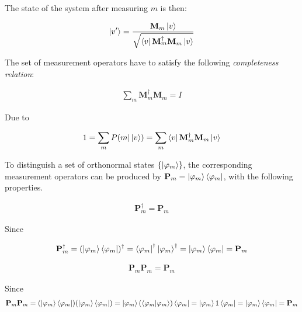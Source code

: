 The state of the system after measuring $m$ is then:

\begin{align*}
    \ket{v'} = \frac{\mathbf{M}_m\ket{v}}{\sqrt{\bra{v} \mathbf{M}_m^{\dagger} \mathbf{M}_m \ket{v}}}
\end{align*}

The set of measurement operators have to satisfy the following \textit{completeness relation}:

\begin{align*}
    \sum\limits_{m}  \mathbf{M}_m^{\dagger} \mathbf{M}_m = I
\end{align*}

Due to

\begin{align*}
    1 = \sum\limits_{m} P(m | \ket{v}) = \sum\limits_{m} \bra{v} \mathbf{M}_m^{\dagger} \mathbf{M}_m \ket{v}
\end{align*}


To distinguish a set of orthonormal states $\{\ket{\varphi_m}\}$, the corresponding measurement operators can be produced by $\mathbf{P}_m = \ket{\varphi_m}\bra{\varphi_m}$, with the following properties.

\begin{property}

\begin{align*}
\mathbf{P}_m^{\dagger} = \mathbf{P}_m
\end{align*}

Since

\begin{align*}
\mathbf{P}_m^{\dagger} =
(\ket{\varphi_m}\bra{\varphi_m})^{\dagger} =
\bra{\varphi_m}^{\dagger}\ket{\varphi_m}^{\dagger} =
\ket{\varphi_m}\bra{\varphi_m} =
\mathbf{P}_m
\end{align*}

\end{property}

\begin{property}

\begin{align*}
\mathbf{P}_m\mathbf{P}_m = \mathbf{P}_m
\end{align*}

Since
\begin{align*}
\mathbf{P}_m\mathbf{P}_m =
(\ket{\varphi_m}\bra{\varphi_m})(\ket{\varphi_m}\bra{\varphi_m}) =
\ket{\varphi_m}(\bra{\varphi_m}\ket{\varphi_m})\bra{\varphi_m} =
\ket{\varphi_m}1\bra{\varphi_m} =
\ket{\varphi_m}\bra{\varphi_m} =
\mathbf{P}_m
\end{align*}

\end{property}


